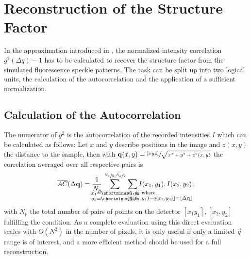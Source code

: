 \section{Reconstruction of the Structure Factor}
In the approximation introduced  in , the normalized intensity correlation $g^2(\Delta q)-1$ has to be calculated to recover the structure factor from the simulated fluorescence speckle patterns. The task can be split up into two logical units, the calculation of the autocorrelation and the application of a sufficient normalization.

\subsection{Calculation of the Autocorrelation}
\label{sec:corr}
The numerator of $g^2$ is the autocorrelation of the recorded intensities $I$ which can be calculated as follows:
Let $x$ and $y$ describe positions in the image and $z(x,y)$ the distance to the sample, then 
with $\mathbf{q}(x,y) = \sfrac{[x y z]}{\sqrt{x ^ 2 + y ^ 2 + z^2(x,y)}}$  the correlation averaged over all respective pairs is
\begin{equation}
	\overline{AC}(\Delta \vec{q}) = 
	\frac{1}{N_p} \quad \sum^{	\crampedclap{\sfrac{N_x}{2},\sfrac{N_y}{2}}}_{
		\crampedclap{
			\begin{subarray}{l}
				x_1=\shortminus\sfrac{N_x}{2}\\
				y_1=\shortminus\sfrac{N_y}{2}
			\end{subarray}
	}}\quad
	\sum_{\crampedclap{\qquad\qquad\qquad\qquad
			\begin{subarray}{l}
				x_2,y_2 \text{ where} \\ \lfloor q(x_1,y_1)-q(x_2,y_2)\rfloor=\lfloor\Delta\vec{q}\rfloor
	\end{subarray}}}
	I(x_1,y_1),I(x_2,y_2) \,,
	\label{eq:correlation}
\end{equation}
with $N_p$ the total number of pairs of points on the detector $[x_1 y_1],[x_2,y_2]$  fulfilling the condition. As a complete evaluation using this direct evaluation scales with $O(N^2)$ in the number of pixels, it is only useful if only a limited $\vec{q}$ range is of interest, and a more efficient method should be used for a full reconstruction.

